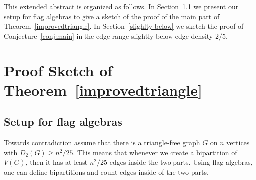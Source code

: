 \documentclass{svproc}
\begin{document}
This extended abstract is organized as follows. In Section~\ref{flagsection} we present our setup for flag algebras to give a sketch of the proof of the main part of Theorem~\ref{improvedtriangle}. In Section~\ref{slighlty below} we sketch the proof of Conjecture~\ref{conj:main} in the edge range slightly below edge density $2/5$. 

\section{Proof Sketch of Theorem~\ref{improvedtriangle}}
\subsection{Setup for flag algebras}
\label{flagsection}

Towards contradiction assume that there is a triangle-free graph $G$ on $n$ vertices with $D_2(G)\geq n^2/25$.
This means that whenever we create a bipartition of $V(G)$, then it has at least $n^2/25$ edges inside the two parts.
Using flag algebras, one can define bipartitions and count edges inside of the two parts.


\newcommand{\vc}[1]{\ensuremath{\vcenter{\hbox{#1}}}}
\end{document}
